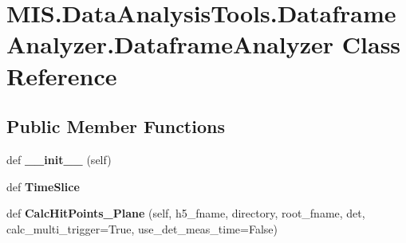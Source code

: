 \hypertarget{classMIS_1_1DataAnalysisTools_1_1DataframeAnalyzer_1_1DataframeAnalyzer}{}\section{M\+I\+S.\+Data\+Analysis\+Tools.\+Dataframe\+Analyzer.\+Dataframe\+Analyzer Class Reference}
\label{classMIS_1_1DataAnalysisTools_1_1DataframeAnalyzer_1_1DataframeAnalyzer}
\subsection*{Public Member Functions}
\begin{DoxyCompactItemize}
\item 
\mbox{\label{classMIS_1_1DataAnalysisTools_1_1DataframeAnalyzer_1_1DataframeAnalyzer_a923e5f4ebdad2286aa2d136ffea4f97d}} 
def {\bfseries \+\_\+\+\_\+init\+\_\+\+\_\+} (self)
\item 
\mbox{\label{classMIS_1_1DataAnalysisTools_1_1DataframeAnalyzer_1_1DataframeAnalyzer_abe4b7b0c4cf082095c9464239d6e2f30}} 
def {\bfseries Time\+Slice}
\item 
\mbox{\label{classMIS_1_1DataAnalysisTools_1_1DataframeAnalyzer_1_1DataframeAnalyzer_a1fdbfc6948cd21bb66da3f30bcdcf109}} 
def {\bfseries Calc\+Hit\+Points\+\_\+Plane} (self, h5\+\_\+fname, directory, root\+\_\+fname, det, calc\+\_\+multi\+\_\+trigger=True, use\+\_\+det\+\_\+meas\+\_\+time=False)
\end{DoxyCompactItemize}
